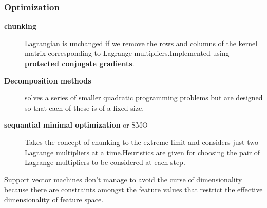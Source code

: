 \subsubsection{Optimization}
\begin{description}
	\item[\textbf{chunking}]Lagrangian is unchanged if we remove the rows and columns of the kernel matrix corresponding to Lagrange multipliers.Implemented using \textbf{protected conjugate gradients}.
	\item[\textbf{Decomposition methods}] solves a series of smaller quadratic programming problems but are designed so that each of these is of a fixed size.
	\item[\textbf{sequantial minimal optimization} or SMO] Takes the concept of chunking to the extreme limit and considers just two Lagrange multipliers at a time.Heuristics are given for choosing the pair of Lagrange multipliers to be considered at each step.
\end{description}

Support vector machines don't manage to avoid the curse of dimensionality because there are constraints amongst the feature values that restrict the effective dimensionality of feature space.




